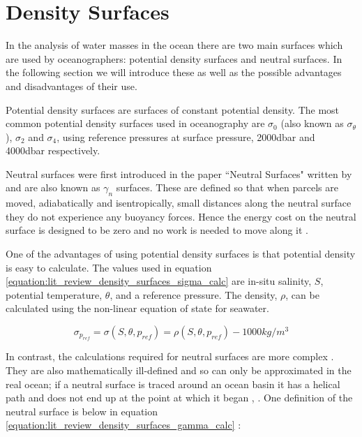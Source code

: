 \section{Density Surfaces}
\label{section:lit_review_density_surfaces}

In the analysis of water masses in the ocean there are two main surfaces which are used by oceanographers: potential density surfaces and neutral surfaces. In the following section we will introduce these as well as the possible advantages and disadvantages of their use. 

Potential density surfaces are surfaces of constant potential density. The most common potential density surfaces used in oceanography are $\sigma_0$ (also known as $\sigma_\theta$), $\sigma_2$ and $\sigma_4$, using reference pressures at surface pressure, 2000dbar and 4000dbar respectively.

Neutral surfaces were first introduced in the paper ``Neutral Surfaces" written by \citet{McDougall1987} and are also known as $\gamma_n$ surfaces. These are defined so that when parcels are moved, adiabatically and isentropically, small distances along the neutral surface they do not experience any buoyancy forces. Hence the energy cost on the neutral surface is designed to be zero and no work is needed to move along it \citep{McDougall1987}. 

One of the advantages of using potential density surfaces is that potential density is easy to calculate. The values used in equation \ref{equation:lit_review_density_surfaces_sigma_calc} are in-situ salinity, $S$, potential temperature, $\theta$, and a reference pressure. The density, $\rho$, can be calculated using the non-linear equation of state for seawater. 

\begin{equation}
    \sigma_{p_{ref}} = \sigma(S,\theta,p_{ref}) = \rho(S,\theta, p_{ref}) - 1000kg/m^3
    \label{equation:lit_review_density_surfaces_sigma_calc}
\end{equation}

In contrast, the calculations required for neutral surfaces are more complex \citep{STANLEY2019}. They are also mathematically ill-defined and so can only be approximated in the real ocean; if a neutral surface is traced around an ocean basin it has a helical path and does not end up at the point at which it began \citep{McDougall1987}, \citep{STANLEY2019}. One definition of the neutral surface is below in equation \ref{equation:lit_review_density_surfaces_gamma_calc} \citep{McDougall1987}:

